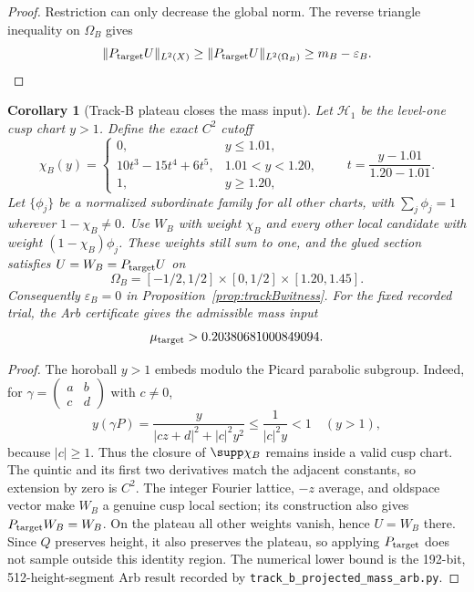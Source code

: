 \documentclass[11pt]{amsart}
\newtheorem{corollary}[theorem]{Corollary}
\theoremstyle{definition}
\newcommand{\norm}[1]{\lVert #1\rVert}
\newcommand{\abs}[1]{\lvert #1\rvert}
\begin{document}
\begin{proof}
Restriction can only decrease the global norm. The reverse triangle
inequality on $\Omega_B$ gives
\[
 \norm{P_{\rm target}U}_{L^2(X)}
 \ge \norm{P_{\rm target}U}_{L^2(\Omega_B)}
 \ge m_B-\varepsilon_B.
\]
\end{proof}

\begin{corollary}[Track-B plateau closes the mass input]
\label{cor:trackBplateau}
Let $\mathcal H_1$ be the level-one cusp chart $y>1$. Define the exact
$C^2$ cutoff
\[
 \chi_B(y)=
 \begin{cases}
 0,&y\le1.01,\\
 10t^3-15t^4+6t^5,&1.01<y<1.20,\\
 1,&y\ge1.20,
 \end{cases}
 \qquad t=\frac{y-1.01}{1.20-1.01}.
\]
Let $\{\phi_j\}$ be a normalized subordinate family for all other charts,
with $\sum_j\phi_j=1$ wherever $1-\chi_B\ne0$. Use $W_B$ with weight
$\chi_B$ and every other local candidate with weight
$(1-\chi_B)\phi_j$. These weights still sum to one, and the glued section
satisfies
$U=W_B=P_{\rm target}U$ on
\[
 \Omega_B=[-1/2,1/2]\times[0,1/2]\times[1.20,1.45].
\]
Consequently $\varepsilon_B=0$ in
Proposition~\ref{prop:trackBwitness}. For the fixed recorded trial, the Arb
certificate gives the admissible mass input
\begin{equation}\label{eq:trackBnumericmass}
 \mu_{\rm target}>0.20380681000849094.
\end{equation}
\end{corollary}

\begin{proof}
The horoball $y>1$ embeds modulo the Picard parabolic subgroup. Indeed, for
$\gamma=\left(\begin{smallmatrix}a&b\\c&d\end{smallmatrix}\right)$ with
$c\ne0$,
\[
 y(\gamma P)=\frac{y}{\abs{cz+d}^2+\abs c^2y^2}
 \le\frac1{\abs c^2y}<1
 \quad(y>1),
\]
because $\abs c\ge1$. Thus the closure of $\supp\chi_B$ remains inside a
valid cusp chart. The quintic and its first two derivatives match the
adjacent constants, so extension by zero is $C^2$. The integer Fourier
lattice, $-z$ average, and oldspace vector make $W_B$ a genuine cusp local
section; its construction also gives $P_{\rm target}W_B=W_B$. On the plateau
all other weights vanish, hence $U=W_B$ there. Since $Q$ preserves height, it
also preserves the plateau, so applying $P_{\rm target}$ does not sample
outside this identity region. The numerical lower bound is the 192-bit,
512-height-segment Arb result recorded by
\texttt{track\_b\_projected\_mass\_arb.py}.
\end{proof}
\end{document}
